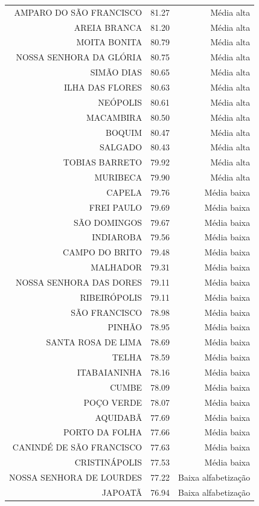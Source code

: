 \begin{longtable}[t]{rlr}
\addlinespace
AMPARO DO SÃO FRANCISCO & 81.27 & Média alta\\
AREIA BRANCA & 81.20 & Média alta\\
MOITA BONITA & 80.79 & Média alta\\
NOSSA SENHORA DA GLÓRIA & 80.75 & Média alta\\
SIMÃO DIAS & 80.65 & Média alta\\
\addlinespace
ILHA DAS FLORES & 80.63 & Média alta\\
NEÓPOLIS & 80.61 & Média alta\\
MACAMBIRA & 80.50 & Média alta\\
BOQUIM & 80.47 & Média alta\\
SALGADO & 80.43 & Média alta\\
\addlinespace
TOBIAS BARRETO & 79.92 & Média alta\\
MURIBECA & 79.90 & Média alta\\
CAPELA & 79.76 & Média baixa\\
FREI PAULO & 79.69 & Média baixa\\
SÃO DOMINGOS & 79.67 & Média baixa\\
\addlinespace
INDIAROBA & 79.56 & Média baixa\\
CAMPO DO BRITO & 79.48 & Média baixa\\
MALHADOR & 79.31 & Média baixa\\
NOSSA SENHORA DAS DORES & 79.11 & Média baixa\\
RIBEIRÓPOLIS & 79.11 & Média baixa\\
\addlinespace
SÃO FRANCISCO & 78.98 & Média baixa\\
PINHÃO & 78.95 & Média baixa\\
SANTA ROSA DE LIMA & 78.69 & Média baixa\\
TELHA & 78.59 & Média baixa\\
ITABAIANINHA & 78.16 & Média baixa\\
\addlinespace
CUMBE & 78.09 & Média baixa\\
POÇO VERDE & 78.07 & Média baixa\\
AQUIDABÃ & 77.69 & Média baixa\\
PORTO DA FOLHA & 77.66 & Média baixa\\
CANINDÉ DE SÃO FRANCISCO & 77.63 & Média baixa\\
\addlinespace
CRISTINÁPOLIS & 77.53 & Média baixa\\
NOSSA SENHORA DE LOURDES & 77.22 & Baixa alfabetização\\
JAPOATÃ & 76.94 & Baixa alfabetização\\

\end{longtable}
